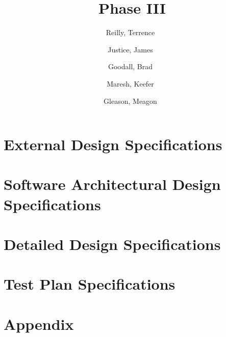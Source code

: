\documentclass[a4paper,12pt]{article}
\author{%
    Reilly, Terrence\
    \and
    Justice, James\
    \and
    Goodall, Brad\
    \and
    Maresh, Keefer\
    \and
    Gleason, Meagon\
}
\title{Phase III}
\begin{document}
    \maketitle

    \section*{External Design Specifications}
        

    \section*{Software Architectural Design Specifications}
        

    \section*{Detailed Design Specifications}
        

    \section*{Test Plan Specifications}
        

    \section*{Appendix}
        
\end{document}
